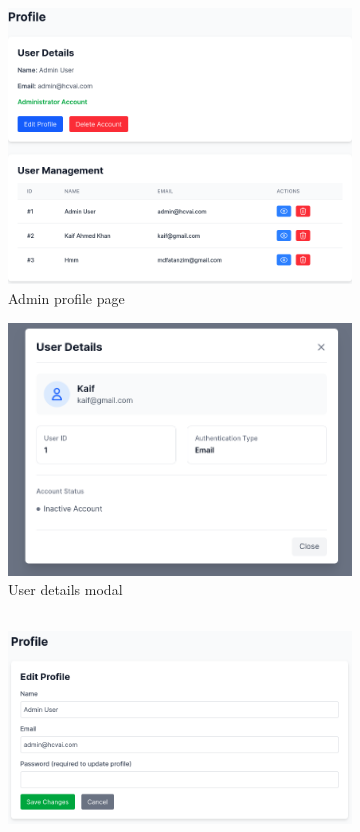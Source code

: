 \begin{figure}[htbp]
  \begin{subfigure}{0.5\textwidth}
    \includegraphics[width=\textwidth]{figures/site/admin.png} 
    \caption{Admin profile page}
    \label{fig:profile}
  \end{subfigure}
  \begin{subfigure}{0.5\textwidth}
  \includegraphics[width=\textwidth]{figures/site/user-details.png}
    \caption{User details modal}
    \label{fig:userdetails}
  \end{subfigure}
  \begin{subfigure}{0.5\textwidth}
    \includegraphics[width=\textwidth,height=6cm]{figures/site/edit.png}

\end{subfigure}
\end{figure}
